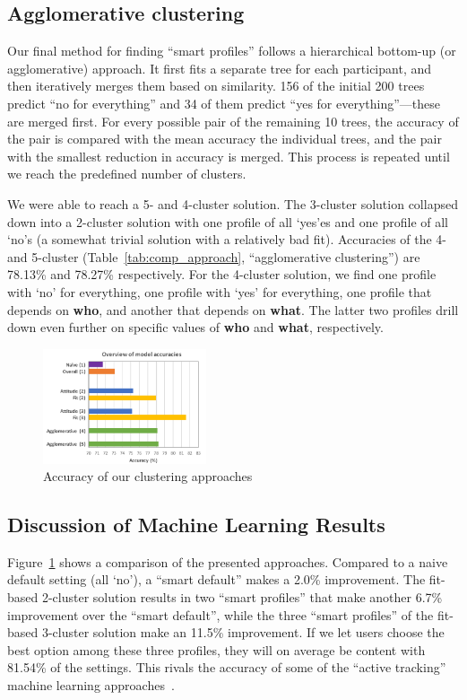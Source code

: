 \subsection{Agglomerative clustering}
Our final method for finding ``smart profiles'' follows a hierarchical bottom-up (or agglomerative) approach. It first fits a separate tree for each participant, and then iteratively merges them based on similarity. 156 of the initial 200 trees predict ``no for everything'' and 34 of them predict ``yes for everything''---these are merged first. For every possible pair of the remaining 10 trees, the accuracy of the pair is compared with the mean accuracy the individual trees, and the pair with the smallest reduction in accuracy is merged. This process is repeated until we reach the predefined number of clusters.

We were able to reach a 5- and 4-cluster solution. The 3-cluster solution collapsed down into a 2-cluster solution with one profile of all `yes'es and one profile of all `no's (a somewhat trivial solution with a relatively bad fit). Accuracies of the 4- and 5-cluster (Table~\ref{tab:comp_approach}, ``agglomerative clustering'') are 78.13\% and 78.27\% respectively. For the 4-cluster solution, we find one profile with `no' for everything, one profile with `yes' for everything, one profile that depends on \textbf{who}, and another that depends on \textbf{what}. The latter two profiles drill down even further on specific values of \textbf{who} and \textbf{what}, respectively.



\begin{figure}[t]
	\centering
	\includegraphics[width=0.43\textwidth]{figures/compare.pdf}
	\caption{Accuracy of our clustering approaches}
	\label{fig:comp_approach}
\end{figure}

\subsection{Discussion of Machine Learning Results}
Figure~\ref{fig:comp_approach} shows a comparison of the presented approaches. Compared to a naive default setting (all `no'), a ``smart default'' makes a 2.0\% improvement. The fit-based 2-cluster solution results in two ``smart profiles'' that make another 6.7\% improvement over the ``smart default'', while the three ``smart profiles'' of the fit-based 3-cluster solution make an 11.5\% improvement. If we let users choose the best option among these three profiles, they will on average be content with 81.54\% of the settings. This rivals the accuracy of some of the ``active tracking'' machine learning approaches~\cite{sadeh2009understanding}.

